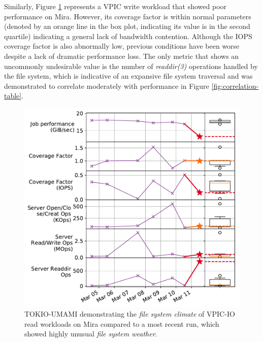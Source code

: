 \documentclass[conference,10pt,compsocconf]{IEEEtran}
\begin{document}
Similarly, Figure \ref{fig:umami-mira-fs1-vpic-write} represents a VPIC write workload that showed poor performance on Mira.  However, its coverage factor is within normal parameters (denoted by an orange line in the box plot, indicating its value is in the second quartile) indicating a general lack of bandwidth contention.  Although the IOPS coverage factor is also abnormally low, previous conditions have been worse despite a lack of dramatic performance loss.  The only metric that shows an uncommonly undesirable value is the number of \emph{readdir(3)} operations handled by the file system, which is indicative of an expansive file system traversal and was demonstrated to correlate moderately with performance in Figure \ref{fig:correlation-table}.

\begin{figure}[t]
    \centering
    \includegraphics[width=1.0\columnwidth]{figs/umami-mira-fs1-vpic-write.pdf}
    \caption{TOKIO-UMAMI demonstrating the \emph{file system climate} of VPIC-IO read workloads
    on Mira compared to a most recent run, which showed
    highly unusual \emph{file system weather}.}
    \label{fig:umami-mira-fs1-vpic-write}
\end{figure}

\hrulefill

\end{document}
